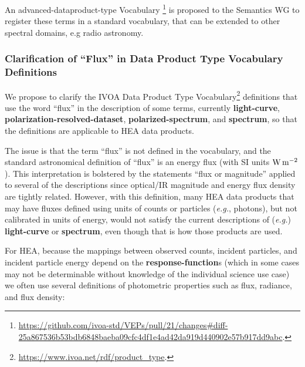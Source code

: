 \documentclass[11pt,a4paper]{ivoa}
\begin{document}
An advanced-dataproduct-type Vocabulary \footnote{\url{https://github.com/ivoa-std/VEPs/pull/21/changes\#diff-25a867536b53bdb6848baeba09cfc4df1e4ad42da919d440902e57b917dd9abc}.} is proposed to the Semantics WG to register these terms in a standard vocabulary, that can be extended to other spectral domains, e.g radio astronomy.  




%

\subsubsection{Clarification of ``Flux'' in Data Product Type Vocabulary Definitions}
\label{sec:flux}

We propose to clarify the IVOA Data Product Type Vocabulary\footnote{\url{https://www.ivoa.net/rdf/product_type}.} definitions that use the word ``flux'' in the description of some terms, currently {\bf light-curve}, {\bf polarization-resolved-dataset}, {\bf polarized-spectrum}, and {\bf spectrum}, so that the definitions are applicable to \gls{HEA} data products.

The issue is that the term ``flux'' is not defined in the vocabulary, and the standard astronomical definition of ``flux'' is an energy flux (with SI units $\rm W\,m^{-2}$).  This interpretation is bolstered by the statements ``flux or magnitude'' applied to several of the descriptions since optical/IR magnitude and energy flux density are tightly related.  However, with this definition, many \gls{HEA} data products that may have fluxes defined using units of counts or particles ({\em e.g.\/}, photons), but not calibrated in units of energy, would not satisfy the current  descriptions of ({\em e.g.\/}) {\bf light-curve} or {\bf spectrum}, even though that is how those products are used.

For \gls{HEA}, because the mappings between observed counts, incident particles, and incident particle energy depend on the {\bf response-function}s (which in some cases may not be determinable without knowledge of the individual science use case) we often use several definitions of photometric properties such as flux, radiance, and flux density:
\end{document}
